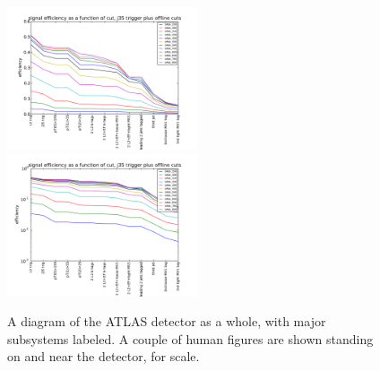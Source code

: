 \begin{figure}
	\includegraphics[width=0.5\textwidth]{TriggerCuts/cut_efficiencies_j35_signal.pdf}	
	\includegraphics[width=0.5\textwidth]{TriggerCuts/cut_efficiencies_logy_j35_signal.pdf}	
    \caption{A diagram of the ATLAS detector as a whole, with major subsystems labeled.  A couple of human figures are shown standing on and near the detector, for scale. \label{fig:signal_eff_cutflow}}
\end{figure}






